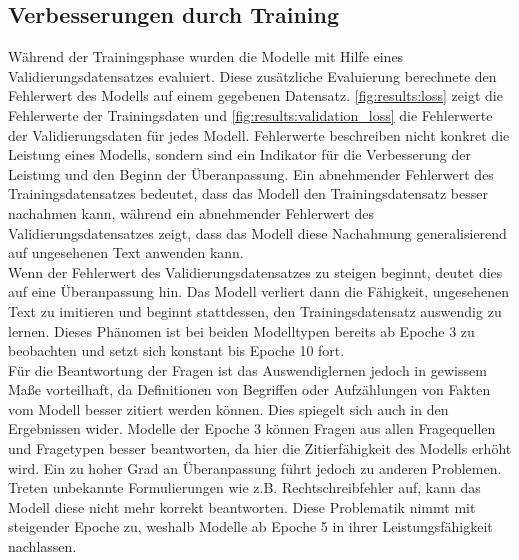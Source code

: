 \subsection{Verbesserungen durch Training}
Während der Trainingsphase wurden die Modelle mit Hilfe eines Validierungsdatensatzes evaluiert.
Diese zusätzliche Evaluierung berechnete den Fehlerwert des Modells auf einem gegebenen Datensatz.
\cref{fig:results:loss} zeigt die Fehlerwerte der Trainingsdaten und \cref{fig:results:validation_loss} die Fehlerwerte der Validierungsdaten für jedes Modell.
Fehlerwerte beschreiben nicht konkret die Leistung eines Modells, sondern sind ein Indikator für die Verbesserung der Leistung und den Beginn der Überanpassung.
Ein abnehmender Fehlerwert des Trainingsdatensatzes bedeutet, dass das Modell den Trainingsdatensatz besser nachahmen kann, während ein abnehmender Fehlerwert des Validierungsdatensatzes zeigt, dass das Modell diese Nachahmung generalisierend auf ungesehenen Text anwenden kann.\\

Wenn der Fehlerwert des Validierungsdatensatzes zu steigen beginnt, deutet dies auf eine Überanpassung hin.
Das Modell verliert dann die Fähigkeit, ungesehenen Text zu imitieren und beginnt stattdessen, den Trainingsdatensatz auswendig zu lernen.
Dieses Phänomen ist bei beiden Modelltypen bereits ab Epoche 3 zu beobachten und setzt sich konstant bis Epoche 10 fort.\\

Für die Beantwortung der Fragen ist das Auswendiglernen jedoch in gewissem Maße vorteilhaft, da Definitionen von Begriffen oder Aufzählungen von Fakten vom Modell besser zitiert werden können.
Dies spiegelt sich auch in den Ergebnissen wider.
Modelle der Epoche 3 können Fragen aus allen Fragequellen und Fragetypen besser beantworten, da hier die Zitierfähigkeit des Modells erhöht wird.
Ein zu hoher Grad an Überanpassung führt jedoch zu anderen Problemen.
Treten unbekannte Formulierungen wie z.B. Rechtschreibfehler auf, kann das Modell diese nicht mehr korrekt beantworten.
Diese Problematik nimmt mit steigender Epoche zu, weshalb Modelle ab Epoche 5 in ihrer Leistungsfähigkeit nachlassen.\\

